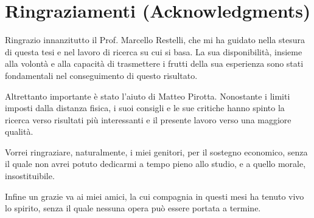 
\bigskip

\begingroup
\let\clearpage\relax
\let\cleardoublepage\relax
\let\cleardoublepage\relax
\chapter*{Ringraziamenti (Acknowledgments)}

Ringrazio innanzitutto il Prof. Marcello Restelli, che mi ha guidato nella stesura di questa tesi e nel lavoro di ricerca su cui si basa. La sua disponibilità, insieme alla volontà e alla capacità di trasmettere i frutti della sua esperienza sono stati fondamentali nel conseguimento di questo risultato.

Altrettanto importante è stato l'aiuto di Matteo Pirotta. Nonostante i limiti imposti dalla distanza fisica, i suoi consigli e le sue critiche hanno spinto la ricerca verso risultati più interessanti e il presente lavoro verso una maggiore qualità.

Vorrei ringraziare, naturalmente, i miei genitori, per il sostegno economico, senza il quale non avrei potuto dedicarmi a tempo pieno allo studio, e a quello morale, insostituibile.

Infine un grazie va ai miei amici, la cui compagnia in questi mesi ha tenuto vivo lo spirito, senza il quale nessuna opera può essere portata a termine.
\endgroup
